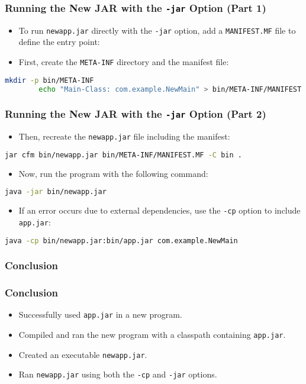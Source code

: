 \documentclass[aspectratio=169, table]{beamer}
\begin{document}
\begin{frame}[fragile]
	\frametitle{\LARGE{Running the New JAR with the \texttt{-jar} Option (Part 1)}}
	\begin{itemize}
		\item To run \texttt{newapp.jar} directly with the \texttt{-jar} option, add a \texttt{MANIFEST.MF} file to define the entry point:
		\item First, create the \texttt{META-INF} directory and the manifest file:
	\end{itemize}
	\begin{lstlisting}[language=bash]
		mkdir -p bin/META-INF
		echo "Main-Class: com.example.NewMain" > bin/META-INF/MANIFEST.MF
	\end{lstlisting}
\end{frame}

\begin{frame}[fragile]
	\frametitle{\LARGE{Running the New JAR with the \texttt{-jar} Option (Part 2)}}
	\begin{itemize}
		\item Then, recreate the \texttt{newapp.jar} file including the manifest:
	\end{itemize}
	\begin{lstlisting}[language=bash]
		jar cfm bin/newapp.jar bin/META-INF/MANIFEST.MF -C bin .
	\end{lstlisting}
	\begin{itemize}
		\item Now, run the program with the following command:
	\end{itemize}
	\begin{lstlisting}[language=bash]
		java -jar bin/newapp.jar
	\end{lstlisting}
	\begin{itemize}
		\item If an error occurs due to external dependencies, use the \texttt{-cp} option to include \texttt{app.jar}:
	\end{itemize}
	\begin{lstlisting}[language=bash]
		java -cp bin/newapp.jar:bin/app.jar com.example.NewMain
	\end{lstlisting}
\end{frame}


\subsubsection{Conclusion}

\begin{frame}
	\frametitle{Conclusion}
	\begin{itemize}
		\item Successfully used \texttt{app.jar} in a new program.
		\item Compiled and ran the new program with a classpath containing \texttt{app.jar}.
		\item Created an executable \texttt{newapp.jar}.
		\item Ran \texttt{newapp.jar} using both the \texttt{-cp} and \texttt{-jar} options.
	\end{itemize}
\end{frame}
\end{document}
